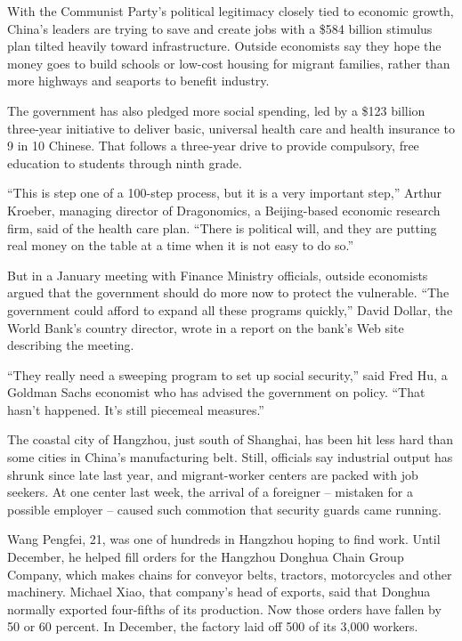 \documentclass[12pt,a4paper,onecolumn]{article}
\begin{document}
\begin{CJK*}{GBK}{song}
With the Communist Party's political legitimacy closely tied to economic growth, China's leaders are
trying to save and create jobs with a \$584 billion stimulus plan tilted heavily toward
infrastructure. Outside economists say they hope the money goes to build schools or low-cost housing
for migrant families, rather than more highways and seaports to benefit industry.

The government has also pledged more social spending, led by a \$123 billion three-year initiative
to deliver basic, universal health care and health insurance to 9 in 10 Chinese. That follows a
three-year drive to provide compulsory, free education to students through ninth grade.

``This is step one of a 100-step process, but it is a very important step,'' Arthur Kroeber,
managing director of Dragonomics, a Beijing-based economic research firm, said of the health care
plan. ``There is political will, and they are putting real money on the table at a time when it is
not easy to do so.''

But in a January meeting with Finance Ministry officials, outside economists argued that the
government should do more now to protect the vulnerable. ``The government could afford to expand all
these programs quickly,'' David Dollar, the World Bank's country director, wrote in a report on the
bank's Web site describing the meeting.

``They really need a sweeping program to set up social security,'' said Fred Hu, a Goldman Sachs
economist who has advised the government on policy. ``That hasn't happened. It's still piecemeal
measures.''

The coastal city of Hangzhou, just south of Shanghai, has been hit less hard than some cities in
China's manufacturing belt. Still, officials say industrial output has shrunk since late last year,
and migrant-worker centers are packed with job seekers. At one center last week, the arrival of a
foreigner -- mistaken for a possible employer -- caused such commotion that security guards came
running.

Wang Pengfei, 21, was one of hundreds in Hangzhou hoping to find work. Until December, he helped
fill orders for the Hangzhou Donghua Chain Group Company, which makes chains for conveyor belts,
tractors, motorcycles and other machinery. Michael Xiao, that company's head of exports, said that
Donghua normally exported four-fifths of its production. Now those orders have fallen by 50 or 60
percent. In December, the factory laid off 500 of its 3,000 workers.


\end{CJK*}
\end{document}
